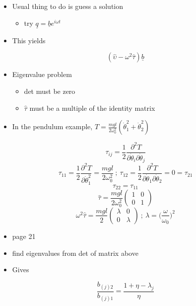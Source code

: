 \documentclass[a4paper,11pt,normalem]{article}
\begin{document}
\begin{itemize}
\item
  Usual thing to do is guess a solution
  \begin{itemize}
  \item
    try \(\underline{q} = \underline{b}e^{i\omega t}\)
  \end{itemize}
\item
  This yields
\end{itemize}

\[
    (\hat{\upsilon} - \omega^{2}\hat{\tau})\underline{b}
\]

\begin{itemize}
\item
  Eigenvalue problem
  \begin{itemize}
  \item
    det must be zero
  \item
    \(\hat{\tau}\) must be a multiple of the identity matrix
  \end{itemize}
\item
  In the pendulum example,
  \(T = \frac{mgl}{2\omega_{0}^2}(\dot{\theta}_{1}^2 + \dot{\theta}_{2}^2)\)
\end{itemize}

\[
    \tau_{ij} = \frac{1}{2} \frac{\partial^2 T}{\partial \dot{\theta}_{i} \partial \dot{\theta}_{j}}
\] \[
    \tau_{11} = \frac{1}{2} \frac{\partial^2 T}{\partial \dot{\theta}_{1}^{2}} = \frac{mgl}{2\omega_{0}^2} ~;~ \tau_{12} = \frac{1}{2}\frac{\partial^2 T}{\partial \dot{\theta}_{1} \partial \dot{\theta}_{2}} = 0 = \tau_{21}
\] \[
    \tau_{22} = \tau_{11}
\] \[
    \hat{\tau} = \frac{mgl}{2\omega_{0}^2}\begin{pmatrix} 1 & 0 \\ 0 & 1 \end{pmatrix}
\] \[
    \omega^2 \hat{\tau} = \frac{mgl}{2}\begin{pmatrix} \lambda & 0 \\ 0 & \lambda \end{pmatrix} ~;~ \lambda = \Big(\frac{\omega}{\omega_{0}} \Big)^2
\]

\begin{itemize}
\item
  page 21
\item
  find eigenvalues from det of matrix above
\item
  Gives
\end{itemize}

\[
    \frac{b_{(j)2}}{b_{(j)1}} = \frac{1 + \eta - \lambda_{j}}{\eta}
\]
\end{document}
